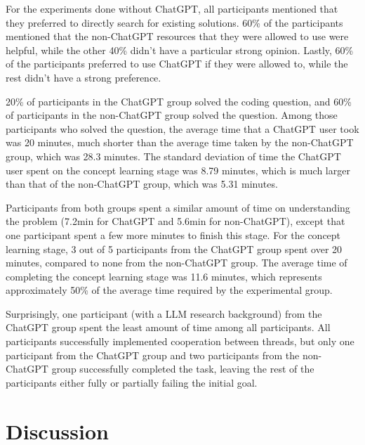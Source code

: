 \documentclass[manuscript,screen,nonacm]{acmart}
\begin{document}
For the experiments done without ChatGPT, all participants mentioned that they preferred to directly search for existing solutions. 60\% of the participants mentioned that the non-ChatGPT resources that they were allowed to use were helpful, while the other 40\% didn’t have a particular strong opinion. Lastly, 60\% of the participants preferred to use ChatGPT if they were allowed to, while the rest didn’t have a strong preference. 

20\% of participants in the ChatGPT group solved the coding question, and 60\% of participants in the non-ChatGPT group solved the question. Among those participants who solved the question, the average time that a ChatGPT user took was 20 minutes, much shorter than the average time taken by the non-ChatGPT group, which was 28.3 minutes. The standard deviation of time the ChatGPT user spent on the concept learning stage was 8.79 minutes, which is much larger than that of the non-ChatGPT group, which was 5.31 minutes.

Participants from both groups spent a similar amount of time on understanding the problem (7.2min for ChatGPT and 5.6min for non-ChatGPT), except that one participant spent a few more minutes to finish this stage. For the concept learning stage, 3 out of 5 participants from the ChatGPT group spent over 20 minutes, compared to none from the non-ChatGPT group. The average time of completing the concept learning stage was 11.6 minutes, which represents approximately 50\% of the average time required by the experimental group. 

Surprisingly, one participant (with a LLM research background) from the ChatGPT group spent the least amount of time among all participants. All participants successfully implemented cooperation between threads, but only one participant from the ChatGPT group and two participants from the non-ChatGPT group successfully completed the task, leaving the rest of the participants either fully or partially failing the initial goal.


\section{Discussion} 

\end{document}
